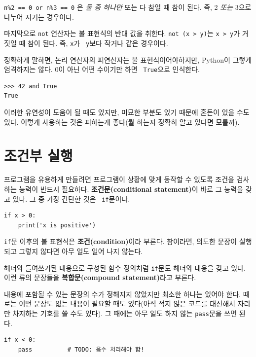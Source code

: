\documentclass[10pt]{book}
\begin{document}
{\tt n\%2 == 0 or n\%3 == 0} 은 {\em 둘 중 하나만} 또는 { 다} 참일
때 참이 된다.  즉, 2 {\em 또는} 3으로 나누어 지거는 경우이다.

마지막으로 {\tt not} 연산자는 불 표현식의 반대 값을 취한다.  {\tt not
  (x > y)}는 {\tt x > y}가 거짓일 때 참이 된다.  즉, {\tt x}가 {\tt
  y}보다 작거나 같은 경우이다.

정확하게 말하면, 논리 연산자의 피연산자는 불 표현식이어야하지만,
Python이 그렇게 엄격하지는 않다.  0이 아닌 어떤 수이기만 하면 {\tt
  True}으로 인식한다.

\begin{verbatim}
>>> 42 and True
True
\end{verbatim}
%
이러한 유연성이 도움이 될 때도 있지만, 미묘한 부분도 있기 때문에 혼돈이
있을 수도 있다.  이렇게 사용하는 것은 피하는게 좋다(뭘 하는지 정확히
알고 있다면 모를까).


\section{조건부 실행}
\label{conditional.execution}


프로그램을 유용하게 만들려면 프로그램이 상황에 맞게 동작할 수 있도록
조건을 검사하는 능력이 반드시 필요하다.  {\bf 조건문(conditional
  statement)}이 바로 그 능력을 갖고 있다.  그 중 가장 간단한 것은 {\tt
  if}문이다.

\begin{verbatim}
if x > 0:
    print('x is positive')
\end{verbatim}
%
{\tt if}문 이후의 불 표현식은 {\bf 조건(condition)}이라 부른다.
참이라면, 의도한 문장이 실행되고 그렇지 않다면 아무 일도 일어 나지
않는다.

헤더와 들여쓰기된 내용으로 구성된 함수 정의처럼 {\tt if}문도 헤더와
내용을 갖고 있다.  이런 류의 문장들을 {\bf 복합문(compound
  statement)}라고 부른다.

내용에 포함될 수 있는 문장의 수가 정해지지 않았지만 최소한 하나는
있어야 한다.  때로는 어떤 문장도 없는 내용이 필요할 때도 있다(아직 적지
않은 코드를 대신해서 자리만 차지하는 기호를 쓸 수도 있다).  그 때에는
아무 일도 하지 않는 {\tt pass}문을 쓰면 된다.

\begin{verbatim}
if x < 0:
    pass          # TODO: 음수 처리해야 함!
\end{verbatim}
%
\end{document}
